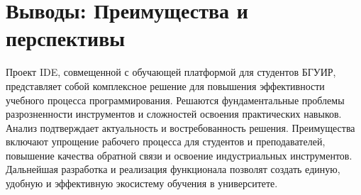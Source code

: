 \documentclass{bsuir}
\begin{document}
\section{Выводы: Преимущества и перспективы}

Проект IDE, совмещенной с обучающей платформой для студентов БГУИР, представляет
собой комплексное решение для повышения эффективности учебного процесса
программирования. Решаются фундаментальные проблемы разрозненности инструментов
и сложностей освоения практических навыков. Анализ подтверждает актуальность
и востребованность решения. Преимущества включают упрощение рабочего процесса
для студентов и преподавателей, повышение качества обратной связи и освоение
индустриальных инструментов. Дальнейшая разработка и реализация функционала
позволят создать единую, удобную и эффективную экосистему обучения в университете.
\end{document}
